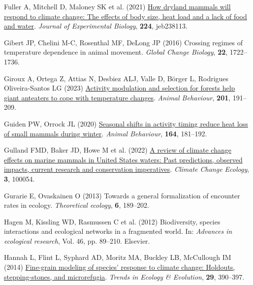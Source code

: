 \documentclass[
  12pt,
]{article}
\newlength{\cslhangindent}
\newenvironment{CSLReferences}[2] %
 {\begin{list}{}{%
  \setlength{\itemindent}{0pt}
  \setlength{\leftmargin}{0pt}
  \setlength{\parsep}{0pt}
  \ifodd #1
   \setlength{\leftmargin}{\cslhangindent}
   \setlength{\itemindent}{-1\cslhangindent}
  \fi
  \setlength{\itemsep}{#2\baselineskip}}}
 {\end{list}}
\begin{document}
\begin{CSLReferences}{1}{0}
Fuller A, Mitchell D, Maloney SK et al. (2021) \href{https://doi.org/10.1242/jeb.238113}{How dryland mammals will respond to climate change: The effects of body size, heat load and a lack of food and water}. \emph{Journal of Experimental Biology}, \textbf{224}, jeb238113.

Gibert JP, Chelini M-C, Rosenthal MF, DeLong JP (2016) Crossing regimes of temperature dependence in animal movement. \emph{Global Change Biology}, \textbf{22}, 1722--1736.

Giroux A, Ortega Z, Attias N, Desbiez ALJ, Valle D, Börger L, Rodrigues Oliveira-Santos LG (2023) \href{https://doi.org/10.1016/j.anbehav.2023.04.008}{Activity modulation and selection for forests help giant anteaters to cope with temperature changes}. \emph{Animal Behaviour}, \textbf{201}, 191--209.

Guiden PW, Orrock JL (2020) \href{https://doi.org/10.1016/j.anbehav.2020.04.014}{Seasonal shifts in activity timing reduce heat loss of small mammals during winter}. \emph{Animal Behaviour}, \textbf{164}, 181--192.

Gulland FMD, Baker JD, Howe M et al. (2022) \href{https://doi.org/10.1016/j.ecochg.2022.100054}{A review of climate change effects on marine mammals in {United} {States} waters: {Past} predictions, observed impacts, current research and conservation imperatives}. \emph{Climate Change Ecology}, \textbf{3}, 100054.

Gurarie E, Ovaskainen O (2013) Towards a general formalization of encounter rates in ecology. \emph{Theoretical ecology}, \textbf{6}, 189--202.

{Hagen M, Kissling WD, Rasmussen C et al.} (2012) Biodiversity, species interactions and ecological networks in a fragmented world. In: \emph{Advances in ecological research}, Vol. 46, pp. 89--210. Elsevier.

Hannah L, Flint L, Syphard AD, Moritz MA, Buckley LB, McCullough IM (2014) \href{https://doi.org/10.1016/j.tree.2014.04.006}{Fine-grain modeling of species' response to climate change: Holdouts, stepping-stones, and microrefugia}. \emph{Trends in Ecology \& Evolution}, \textbf{29}, 390--397.


\end{CSLReferences}
\end{document}
